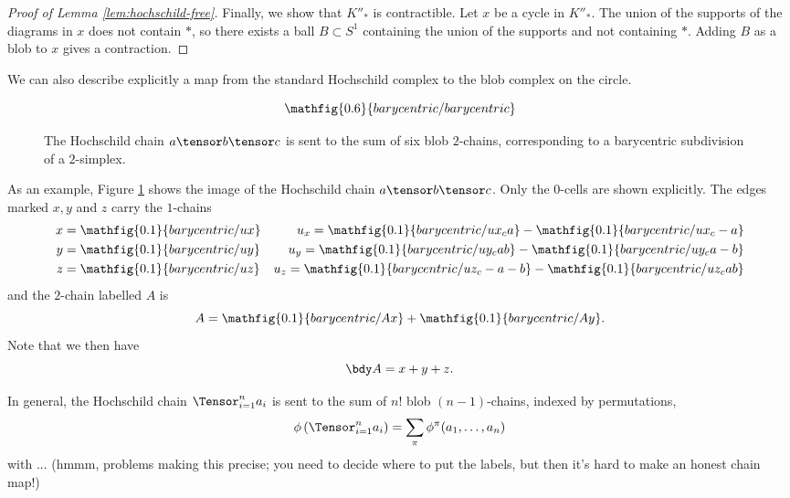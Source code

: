 \begin{proof}[Proof of Lemma \ref{lem:hochschild-free}]
Finally, we show that $K''_*$ is contractible.
Let $x$ be a cycle in $K''_*$.
The union of the supports of the diagrams in $x$ does not contain $*$, so there exists a
ball $B \subset S^1$ containing the union of the supports and not containing $*$.
Adding $B$ as a blob to $x$ gives a contraction.
\end{proof}

We can also describe explicitly a map from the standard Hochschild
complex to the blob complex on the circle. 

\begin{figure}%
$$\mathfig{0.6}{barycentric/barycentric}$$
\caption{The Hochschild chain $a \tensor b \tensor c$ is sent to
the sum of six blob $2$-chains, corresponding to a barycentric subdivision of a $2$-simplex.}
\label{fig:Hochschild-example}%
\end{figure}

As an example, Figure \ref{fig:Hochschild-example} shows the image of the Hochschild chain $a \tensor b \tensor c$. Only the $0$-cells are shown explicitly.
The edges marked $x, y$ and $z$ carry the $1$-chains
\begin{align*}
x & = \mathfig{0.1}{barycentric/ux} & u_x = \mathfig{0.1}{barycentric/ux_ca} - \mathfig{0.1}{barycentric/ux_c-a} \\
y & = \mathfig{0.1}{barycentric/uy} & u_y = \mathfig{0.1}{barycentric/uy_cab} - \mathfig{0.1}{barycentric/uy_ca-b} \\
z & = \mathfig{0.1}{barycentric/uz} & u_z = \mathfig{0.1}{barycentric/uz_c-a-b} - \mathfig{0.1}{barycentric/uz_cab}
\end{align*}
and the $2$-chain labelled $A$ is
\begin{equation*}
A = \mathfig{0.1}{barycentric/Ax}+\mathfig{0.1}{barycentric/Ay}.
\end{equation*}
Note that we then have
\begin{equation*}
\bdy A = x+y+z.
\end{equation*}

In general, the Hochschild chain $\Tensor_{i=1}^n a_i$ is sent to the sum of $n!$ blob $(n-1)$-chains, indexed by permutations,
$$\phi\left(\Tensor_{i=1}^n a_i\right) = \sum_{\pi} \phi^\pi(a_1, \ldots, a_n)$$
with ... (hmmm, problems making this precise; you need to decide where to put the labels, but then it's hard to make an honest chain map!)
